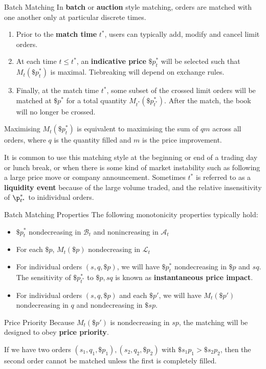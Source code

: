 \documentclass{beamer}
\begin{document}
\begin{frame}{Batch Matching}
	In \textbf{batch} or \textbf{auction} style matching, orders are matched with one another only at particular discrete times.

	\pause

	\begin{enumerate}
		\item Prior to the \textbf{match time} $t^*$, users can typically add, modify and cancel limit orders.
		\item At each time $t\leq t^*$, an \textbf{indicative price} $\$p^*_t$ will be selected such that $M_t(\$p^*_t)$ is maximal. Tiebreaking will depend on exchange rules.
		\item Finally, at the match time $t^*$, some subset of the crossed limit orders will be matched at $\$p^*$ for a total quantity $M_{t^*}(\$p^*_{t^*})$. After the match, the book will no longer be crossed.
	\end{enumerate}

	\pause

	Maximising $M_t(\$p^*_t)$ is equivalent to maximising the sum of $qm$ across all orders, where $q$ is the quantity filled and $m$ is the price improvement.%

	It is common to use this matching style at the beginning or end of a trading day or lunch break, or when there is some kind of market instability such as following a large price move or company announcement. Sometimes $t^*$ is referred to as a \textbf{liquidity event} because of the large volume traded, and the relative insensitivity of $\p^*_{t^*}$ to inidividual orders.%
\end{frame}

\begin{frame}{Batch Matching Properties}
	The following monotonicity properties typically hold:
	\begin{itemize}
		\item $\$p^*_t$ nondecreasing in $\mathcal{B}_t$ and nonincreasing in $\mathcal{A}_t$
		\item For each $\$p$, $M_t(\$p)$ nondecreasing in $\mathcal{L}_t$
		\item For individual orders $(s,q,\$p)$, we will have $\$p^*_t$ nondecreasing in $\$p$ and $sq$. The sensitivity of $\$p^*_{t^*}$ to $\$p,sq$ is known as \textbf{instantaneous price impact}.
		\item For individual orders $(s,q,\$p)$ and each $\$p'$, we will have $M_t(\$p')$ nondecreasing in $q$ and nondecreasing in $\$sp$.
	\end{itemize}

	\pause

	\begin{block}{Price Priority}
		Because $M_t(\$p')$ is nondecreasing in $sp$, the matching will be designed to obey \textbf{price priority}.
	
		If we have two orders $(s_1,q_1,\$p_1), (s_2,q_2,\$p_2)$ with $\$s_1p_1 > \$s_2p_2$, then the second order cannot be matched unless the first is completely filled.
	\end{block}
\end{frame}
\end{document}
